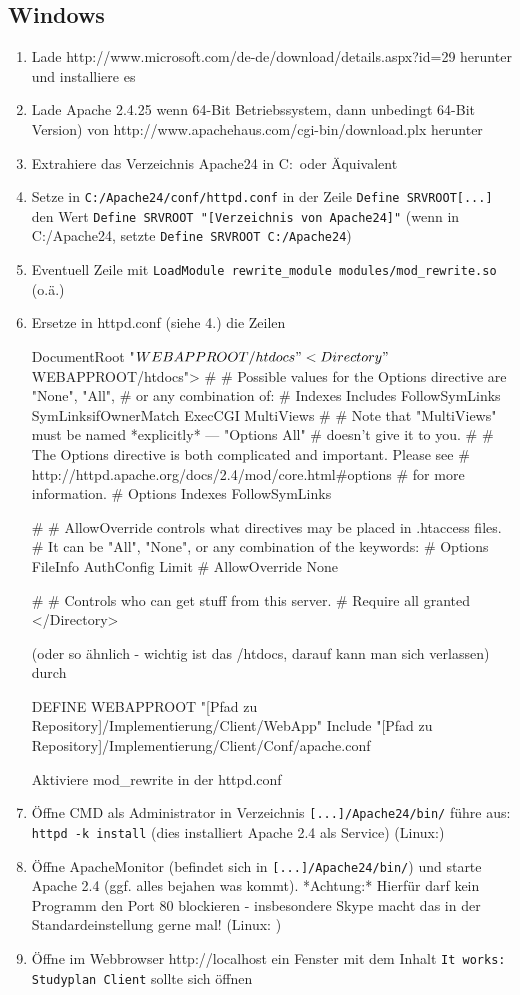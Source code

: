 \subsection{Windows}
\begin{enumerate}
\item Lade http://www.microsoft.com/de-de/download/details.aspx?id=29 herunter und installiere es
\item Lade Apache 2.4.25 wenn 64-Bit Betriebssystem, dann unbedingt 64-Bit Version) von http://www.apachehaus.com/cgi-bin/download.plx herunter
\item Extrahiere das Verzeichnis Apache24 in C:\ oder Äquivalent
\item Setze in \texttt{C:/Apache24/conf/httpd.conf} in der Zeile \texttt{Define SRVROOT[...]} den Wert \texttt{Define SRVROOT "[Verzeichnis von Apache24]"} 
\subitem (wenn in C:/Apache24, setzte \texttt{Define SRVROOT C:/Apache24})
\item Eventuell Zeile mit \texttt{LoadModule rewrite\_module modules/mod\_rewrite.so} (o.ä.) 
\item Ersetze in httpd.conf (siehe 4.) die Zeilen

\begin{json}
DocumentRoot "${WEBAPPROOT}/htdocs"
<Directory "${WEBAPPROOT}/htdocs">
#
# Possible values for the Options directive are "None", "All",
# or any combination of:
#   Indexes Includes FollowSymLinks SymLinksifOwnerMatch ExecCGI MultiViews
#
# Note that "MultiViews" must be named *explicitly* --- "Options All"
# doesn't give it to you.
#
# The Options directive is both complicated and important.  Please see
# http://httpd.apache.org/docs/2.4/mod/core.html#options
# for more information.
#
Options Indexes FollowSymLinks

#
# AllowOverride controls what directives may be placed in .htaccess files.
# It can be "All", "None", or any combination of the keywords:
#   Options FileInfo AuthConfig Limit
#
AllowOverride None

#
# Controls who can get stuff from this server.
#
Require all granted
</Directory>
\end{json}

(oder so ähnlich - wichtig ist das /htdocs, darauf kann man sich verlassen) durch
\begin{json}
DEFINE WEBAPPROOT "[Pfad zu Repository]/Implementierung/Client/WebApp"
Include "[Pfad zu Repository]/Implementierung/Client/Conf/apache.conf
\end{json}
Aktiviere mod\_rewrite in der httpd.conf
\item Öffne CMD als Administrator in Verzeichnis \texttt{[...]/Apache24/bin/} führe aus: \texttt{httpd -k install} (dies installiert Apache 2.4 als Service) (Linux:)
\item Öffne ApacheMonitor (befindet sich in \texttt{[...]/Apache24/bin/}) und starte Apache 2.4 (ggf. alles bejahen was kommt). *Achtung:* Hierfür darf kein Programm den Port 80 blockieren - insbesondere Skype macht das in der Standardeinstellung gerne mal! (Linux:  )
\item Öffne im Webbrowser http://localhost ein Fenster mit dem Inhalt \texttt{It works: Studyplan Client} sollte sich öffnen
\end{enumerate}
